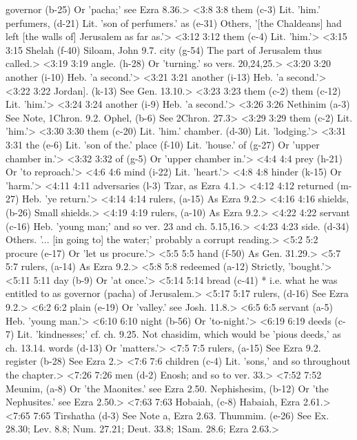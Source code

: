   governor (b-25)  Or 'pacha;' see Ezra 8.36.>
<3:8 3:8  them (c-3) Lit. 'him.'
  perfumers, (d-21)  Lit. 'son of perfumers.'
  as (e-31)  Others, '[the Chaldeans] had left [the walls of] Jerusalem as  far as.'>
<3:12 3:12  them (c-4) Lit. 'him.'>
<3:15 3:15  Shelah (f-40)  Siloam, John 9.7.
  city (g-54)  The part of Jerusalem thus called.>
<3:19 3:19  angle. (h-28)  Or 'turning.' so vers. 20,24,25.>
<3:20 3:20  another (i-10) Heb. 'a second.'>
<3:21 3:21  another (i-13) Heb. 'a second.'>
<3:22 3:22  Jordan]. (k-13)  See Gen. 13.10.>
<3:23 3:23  them (c-2)  them (c-12)
  Lit. 'him.'>
<3:24 3:24  another (i-9)  Heb. 'a second.'>
<3:26 3:26  Nethinim (a-3)  See Note, 1Chron. 9.2.
  Ophel, (b-6)  See 2Chron. 27.3>
<3:29 3:29  them (c-2)  Lit. 'him.'>
<3:30 3:30  them (c-20)  Lit. 'him.'
  chamber. (d-30)  Lit. 'lodging.'>
<3:31 3:31  the (e-6)  Lit. 'son of the.'
  place (f-10)  Lit. 'house.'
  of (g-27) Or 'upper chamber in.'>
<3:32 3:32  of (g-5)  Or 'upper chamber in.'>
<4:4 4:4  prey (h-21)  Or 'to reproach.'>
<4:6 4:6  mind (i-22)  Lit. 'heart.'>
<4:8 4:8  hinder (k-15)  Or 'harm.'>
<4:11 4:11  adversaries (l-3)  Tzar, as Ezra 4.1.>
<4:12 4:12  returned (m-27)  Heb. 'ye return.'>
<4:14 4:14  rulers, (a-15) As Ezra 9.2.>
<4:16 4:16  shields, (b-26)  Small shields.>
<4:19 4:19  rulers, (a-10) As Ezra 9.2.>
<4:22 4:22  servant (c-16)  Heb. 'young man;' and so ver. 23 and ch. 5.15,16.>
<4:23 4:23  side. (d-34)  Others. '... [in going to] the water;' probably a corrupt  reading.>
<5:2 5:2  procure (e-17)  Or 'let us procure.'>
<5:5 5:5  hand (f-50)  As Gen. 31.29.>
<5:7 5:7  rulers, (a-14)  As Ezra 9.2.>
<5:8 5:8  redeemed (a-12)  Strictly, 'bought.'>
<5:11 5:11  day (b-9)  Or 'at once.'>
<5:14 5:14  bread (c-41)  * i.e. what he was entitled to as governor (pacha) of  Jerusalem.>
<5:17 5:17  rulers, (d-16)  See Ezra 9.2.>
<6:2 6:2  plain (e-19)  Or 'valley.' see Josh. 11.8.>
<6:5 6:5  servant (a-5)  Heb. 'young man.'>
<6:10 6:10  night (b-56)  Or 'to-night.'>
<6:19 6:19  deeds (c-7)  Lit. 'kindnesses;' cf. ch. 9.25. Not chasidim, which would  be 'pious deeds,' as ch. 13.14.
  words (d-13)  Or 'matters.'>
<7:5 7:5  rulers, (a-15)  See Ezra 9.2.
  register (b-28)  See Ezra 2.>
<7:6 7:6  children (c-4)  Lit. 'sons,' and so throughout the chapter.>
<7:26 7:26  men (d-2)  Enosh; and so to ver. 33.>
<7:52 7:52  Meunim, (a-8)  Or 'the Maonites.' see Ezra 2.50.
  Nephishesim, (b-12)  Or 'the Nephusites.' see Ezra 2.50.>
<7:63 7:63  Hobaiah, (c-8)  Habaiah, Ezra 2.61.>
<7:65 7:65  Tirshatha (d-3)  See Note a, Ezra 2.63.
  Thummim. (e-26)  See Ex. 28.30; Lev. 8.8; Num. 27.21; Deut. 33.8; 1Sam. 28.6;  Ezra 2.63.>

